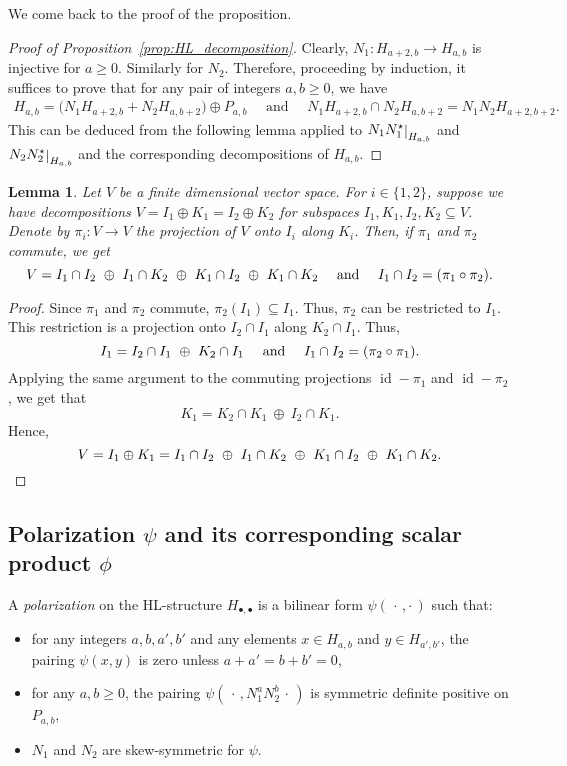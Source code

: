 \documentclass[11pt]{amsart}
\newtheorem{lemma}[thm]{Lemma}
\theoremstyle{definition}
\numberwithin{equation}{section}
\renewcommand{\~}{\widetilde}
\newcommand{\myand}{\text{ and }}
\newcommand{\bul}{\bullet} %
\newcommand{\rest}[1]{\raisebox{-1pt}{$\vert$}_{#1}}
\newcommand{\ccdot}{\,\cdot\,}
\newcommand{\rdot}{\cdot\,}
\let\Im\relax
\DeclareMathOperator{\Im}{Im} %
\DeclareMathOperator{\id}{id} %
\newcommand{\dual}{\star} %
\newcommand{\woplus}{\ \oplus\ } %
\begin{document}
\medskip

We come back to the proof of the proposition.
\begin{proof}[Proof of Proposition~\ref{prop:HL_decomposition}]
Clearly, $N_1\colon H_{a+2,b}\to H_{a,b}$ is injective for $a\geq0$. Similarly for $N_2$. Therefore, proceeding by induction, it suffices to prove that for any pair of integers $a,b\geq0$, we have
\begin{gather*}
H_{a,b}= \bigl(N_1H_{a+2,b} + N_2H_{a,b+2}\bigr) \oplus P_{a,b} \quad  \myand \quad N_1H_{a+2,b} \cap N_2H_{a,b+2} = N_1N_2H_{a+2,b+2}.
\end{gather*}
This can be deduced from the following lemma applied to $N_1N_1^\dual\rest{H_{a,b}}$ and $N_2N_2^\dual\rest{H_{a,b}}$ and the corresponding decompositions of $H_{a,b}$.
\end{proof}

\begin{lemma}
Let $V$ be a finite dimensional vector space. For $i\in\{1,2\}$, suppose we have decompositions $V = I_1 \oplus K_1 = I_2 \oplus K_2$ for subspaces $I_1, K_1, I_2, K_2 \subseteq V$. Denote by $\pi_i\colon V\to V$ the projection of $V$ onto $I_i$ along $K_i$. Then, if $\pi_1$ and $\pi_2$ commute, we get
\[ V=I_1\cap I_2 \woplus I_1\cap K_2 \woplus K_1\cap I_2 \woplus K_1\cap K_2\quad \myand \quad I_1\cap I_2=\Im(\pi_1\circ\pi_2).\]
\end{lemma}

\begin{proof}
Since $\pi_1$ and $\pi_2$ commute, $\pi_2(I_1)\subseteq I_1$. Thus, $\pi_2$ can be restricted to $I_1$. This restriction is a projection onto $I_2 \cap I_1$ along $K_2 \cap I_1$. Thus,
\[ I_1=I_2 \cap I_1 \woplus K_2 \cap I_1 \quad\myand\quad I_1\cap I_2=\Im(\pi_2\circ\pi_1). \]
Applying the same argument to the commuting projections $\id-\pi_1$ and $\id-\pi_2$, we get that
\[ K_1=K_2 \cap K_1 \woplus I_2 \cap K_1. \]
Hence,
\[ V = I_1 \oplus K_1 = I_1\cap I_2 \woplus I_1\cap K_2 \woplus K_1\cap I_2 \woplus K_1\cap K_2. \qedhere \]
\end{proof}



\subsection{Polarization $\psi$ and its corresponding scalar product $\phi$}

A \emph{polarization} on the HL-structure $H_{\bul,\bul}$ is a bilinear form $\psi(\ccdot,\rdot)$ such that:
\begin{itemize}
\item for any integers $a,b,a',b'$ and any elements $x\in H_{a,b}$ and $y\in H_{a',b'}$, the pairing $\psi(x,y)$ is zero unless $a+a'=b+b'=0$,
\item for any $a,b\geq0$, the pairing $\psi(\ccdot,N_1^aN_2^b\ccdot)$ is symmetric definite positive on $P_{a,b}$,
\item $N_1$ and $N_2$ are skew-symmetric for $\psi$.
\end{itemize}
\end{document}
